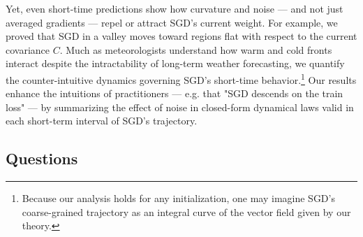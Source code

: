 \documentclass{article}
\theoremstyle{plain}
\theoremstyle{definition}
\begin{document}
        Yet, even short-time predictions show how curvature and noise ---
        and not just averaged gradients --- repel or attract SGD's current
        weight.  For example, we proved that SGD in a valley moves toward
        regions flat with respect to the current covariance $C$.
        Much as meteorologists understand how warm and
        cold fronts interact despite the intractability of long-term weather
        forecasting, we quantify the counter-intuitive dynamics governing SGD's
        short-time behavior.\footnote{
            Because our analysis holds for any initialization, one may imagine
            SGD's coarse-grained trajectory as an integral curve of the vector
            field given by our theory.
        }
        Our results enhance the intuitions of practitioners --- e.g. that "SGD
        descends on the train loss" --- by summarizing the effect of noise in
        closed-form dynamical laws valid in each short-term interval of SGD's
        trajectory.



    \subsection{Questions}
\end{document}
